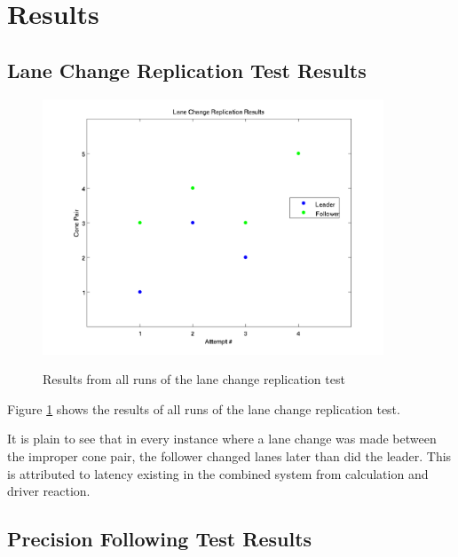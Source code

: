 

\section{Results} \label{sec:results}

\subsection{Lane Change Replication Test Results} \label{sec:lanechangetestresults}

\begin{figure}[ht] \caption{Results from all runs of the lane change replication test} \centering \label{fig:lanechangeresults}
    \includegraphics[width=4in]{./figs/lane_change_results.png}
\end{figure}

Figure \ref{fig:lanechangeresults} shows the results of all runs of the lane change replication test.

It is plain to see that in every instance where a lane change was made between the improper cone pair, the follower changed lanes later than did the leader. This is attributed to latency existing in the combined system from calculation and driver reaction.


\subsection{Precision Following Test Results} \label{sec:precisionfollowingresults}

